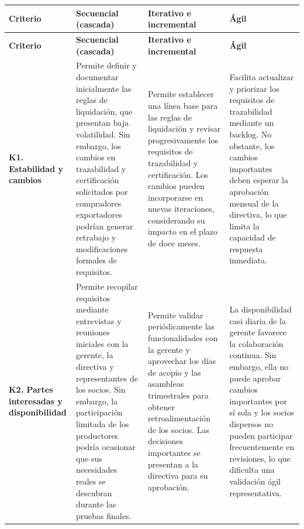 \begin{longtable}{
|>{\raggedright\arraybackslash}p{}
|>{\raggedright\arraybackslash}p{}
|>{\raggedright\arraybackslash}p{}
|>{\raggedright\arraybackslash}p{}|}

\hline
\textbf{Criterio} &
\textbf{Secuencial (cascada)} &
\textbf{Iterativo e incremental} &
\textbf{Ágil} \\
\hline
\endfirsthead

\hline
\textbf{Criterio} &
\textbf{Secuencial (cascada)} &
\textbf{Iterativo e incremental} &
\textbf{Ágil} \\
\hline
\endhead

\textbf{K1. Estabilidad y cambios} &
Permite definir y documentar inicialmente las reglas de liquidación, que presentan baja volatilidad. Sin embargo, los cambios en trazabilidad y certificación solicitados por compradores exportadores podrían generar retrabajo y modificaciones formales de requisitos. &
Permite establecer una línea base para las reglas de liquidación y revisar progresivamente los requisitos de trazabilidad y certificación. Los cambios pueden incorporarse en nuevas iteraciones, considerando su impacto en el plazo de doce meses. &
Facilita actualizar y priorizar los requisitos de trazabilidad mediante un backlog. No obstante, los cambios importantes deben esperar la aprobación mensual de la directiva, lo que limita la capacidad de respuesta inmediata. \\
\hline

\textbf{K2. Partes interesadas y disponibilidad} &
Permite recopilar requisitos mediante entrevistas y reuniones iniciales con la gerente, la directiva y representantes de los socios. Sin embargo, la participación limitada de los productores podría ocasionar que sus necesidades reales se descubran durante las pruebas finales. &
Permite validar periódicamente las funcionalidades con la gerente y aprovechar los días de acopio y las asambleas trimestrales para obtener retroalimentación de los socios. Las decisiones importantes se presentan a la directiva para su aprobación. &
La disponibilidad casi diaria de la gerente favorece la colaboración continua. Sin embargo, ella no puede aprobar cambios importantes por sí sola y los socios dispersos no pueden participar frecuentemente en revisiones, lo que dificulta una validación ágil representativa. \\
\hline


\end{longtable}
